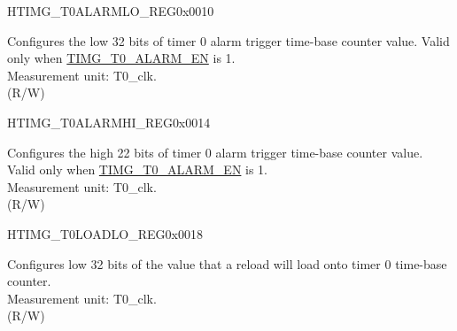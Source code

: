 \begin{register}{H}{TIMG\_T0ALARMLO\_REG}{0x0010}\label{regdesc:TIMGTXALARMLOREG}
%
\regnewline%
\begin{regdesc}\begin{reglist}
\label{fielddesc:TIMGTXALARMLO}\item [TIMG\_T0\_ALARM\_LO] Configures the low 32 bits of timer 0 alarm trigger time-base counter value. Valid only when \hyperref[fielddesc:TIMGTXALARMEN]{TIMG\_T0\_ALARM\_EN} is 1. \\
Measurement unit: T0\_clk. \\
(R/W)
\end{reglist}\end{regdesc}
\end{register}


\begin{register}{H}{TIMG\_T0ALARMHI\_REG}{0x0014}\label{regdesc:TIMGTXALARMHIREG}
%
%
\regnewline%
\begin{regdesc}\begin{reglist}
\label{fielddesc:TIMGTXALARMHI}\item [TIMG\_T0\_ALARM\_HI] Configures the high 22 bits of timer 0 alarm trigger time-base counter value. Valid only when \hyperref[fielddesc:TIMGTXALARMEN]{TIMG\_T0\_ALARM\_EN} is 1. \\
Measurement unit: T0\_clk. \\
(R/W)
\end{reglist}\end{regdesc}
\end{register}


\begin{register}{H}{TIMG\_T0LOADLO\_REG}{0x0018}\label{regdesc:TIMGTXLOADLOREG}
%
\regnewline%
\begin{regdesc}\begin{reglist}
\label{fielddesc:TIMGTXLOADLO}\item [TIMG\_T0\_LOAD\_LO] Configures low 32 bits of the value that a reload will load onto timer 0 time-base counter. \\
Measurement unit: T0\_clk. \\
(R/W)
\end{reglist}\end{regdesc}
\end{register}


